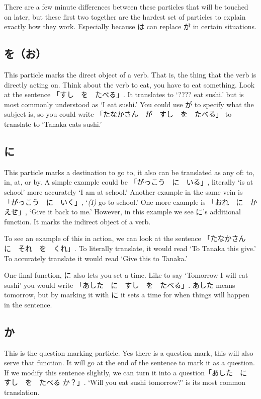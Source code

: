 There are a few minute differences between these particles that will be touched on later, but these first two together are the hardest set of particles to explain exactly how they work. Especially because は can replace が in certain situations.

\subsection*{を（お）}\label{ssec:PR;文法;助詞;を}

This particle marks the direct object of a verb. That is, the thing that the verb is directly acting on. Think about the verb to eat, you have to eat something. Look at the sentence 「すし　を　たべる」. It translates to `???? eat sushi.' but is most commonly understood as `I eat sushi.' You could use が to specify what the subject is, so you could write 「たなかさん　が　すし　を　たべる」 to translate to `Tanaka eats sushi.'

\subsection*{に}\label{ssec:PR;文法;助詞;に}

This particle marks a destination to go to, it also can be translated as any of: to, in, at, or by. A simple example could be 「がっこう　に　いる」, literally `is at school' more accurately `I am at school.' Another example in the same vein is 「がっこう　に　いく」, `\textit{(I)} go to school.' One more example is 「おれ　に　かえせ」, `Give it back to me.' However, in this example we see に's additional function. It marks the indirect object of a verb.

To see an example of this in action, we can look at the sentence 「たなかさん　に　それ　を　くれ」. To literally translate, it would read `To Tanaka this give.' To accurately translate it would read `Give this to Tanaka.'

One final function, に also lets you set a time. Like to say `Tomorrow I will eat sushi' you would write 「あした　に　すし　を　たべる」. あした means tomorrow, but by marking it with に it sets a time for when things will happen in the sentence.

\subsection*{か}\label{ssec:PR;文法;助詞;か}

This is the question marking particle. Yes there is a question mark, this will also serve that function. It will go at the end of the sentence to mark it as a question. If we modify this sentence slightly, we can turn it into a question「あした　に　すし　を　たべる か？」. `Will you eat sushi tomorrow?' is its most common translation.

